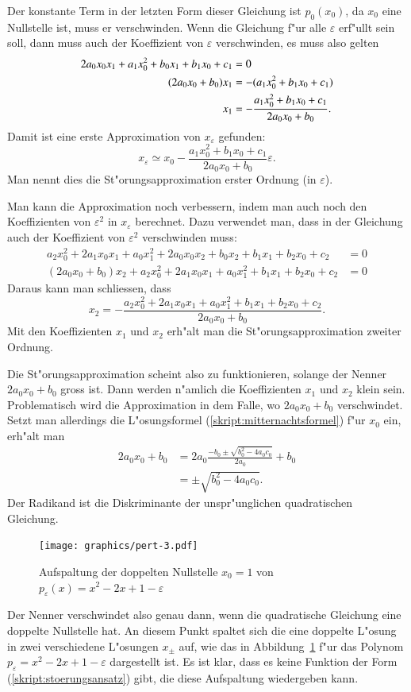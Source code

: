 Der konstante Term in der letzten Form dieser Gleichung ist $p_0(x_0)$, 
da $x_0$ eine Nullstelle ist, muss er verschwinden. Wenn die Gleichung
f"ur alle $\varepsilon$ erf"ullt sein soll, dann muss auch der
Koeffizient von $\varepsilon$ verschwinden, es muss also gelten
\begin{align}
2a_0x_0x_1+a_1x_0^2+b_0x_1+b_1x_0+c_1&= 0
\label{skript:stoerung-1ordnung}
\\
(2a_0x_0+b_0)x_1&=-(a_1x_0^2+b_1x_0+c_1)\\
x_1&=-
\frac{a_1x_0^2+b_1x_0+c_1}{2a_0x_0+b_0}.
\notag
\end{align}
Damit ist eine erste Approximation von $x_\varepsilon$ gefunden:
\[
x_\varepsilon\simeq x_0 -
\frac{a_1x_0^2+b_1x_0+c_1}{2a_0x_0+b_0}\varepsilon.
\]
Man nennt dies die St"orungsapproximation erster Ordnung (in $\varepsilon$).

Man kann die Approximation noch verbessern, indem man auch noch den
Koeffizienten von $\varepsilon^2$ in $x_\varepsilon$ berechnet.
Dazu verwendet man, dass in der Gleichung auch der Koeffizient von
$\varepsilon^2$ verschwinden muss:
\begin{align*}
a_2x_0^2 + 2a_1x_0x_1 + a_0x_1^2 +2a_0x_0x_2
+b_0x_2+b_1x_1+b_2x_0
+c_2
&=0
\\
(2a_0x_0+b_0)x_2
+a_2x_0^2 + 2a_1x_0x_1 + a_0x_1^2
+b_1x_1+b_2x_0
+c_2&=0
\end{align*}
Daraus kann man schliessen, dass
\[
x_2=-\frac{
a_2x_0^2 + 2a_1x_0x_1 + a_0x_1^2
+b_1x_1+b_2x_0
+c_2
}{2a_0x_0+b_0}.
\]
Mit den Koeffizienten $x_1$ und $x_2$ erh"alt man die St"orungsapproximation
zweiter Ordnung.

Die St"orungsapproximation scheint also zu funktionieren, solange
der Nenner $2a_0x_0+b_0$ gross ist. Dann werden n"amlich die 
Koeffizienten $x_1$ und $x_2$ klein sein. Problematisch wird
die Approximation in dem Falle, wo $2a_0x_0+b_0$ verschwindet.
Setzt man allerdings die L"osungsformel (\ref{skript:mitternachtsformel}) f"ur
$x_0$ ein, erh"alt man
\begin{align*}
2a_0x_0+b_0&=2a_0\frac{-b_0\pm\sqrt{b_0^2-4a_0c_0}}{2a_0}+b_0      \\
           &=\pm\sqrt{b_0^2-4a_0c_0}.
\end{align*}
Der Radikand ist die Diskriminante der unspr"unglichen quadratischen
Gleichung.
\begin{figure}
\centering
\texttt{[image: graphics/pert-3.pdf]}
\caption{Aufspaltung der doppelten Nullstelle $x_0=1$ von
$p_\varepsilon(x)=x^2-2x+1-\varepsilon$
\label{skript:entartetenullstellen}}
\end{figure}
Der Nenner verschwindet also genau dann, wenn die quadratische
Gleichung eine doppelte Nullstelle hat. An diesem Punkt spaltet sich
die eine doppelte L"osung in zwei verschiedene L"osungen $x_{\pm}$ auf,
wie das in Abbildung~\ref{skript:entartetenullstellen} f"ur
das Polynom $p_{\varepsilon}=x^2-2x+1-\varepsilon$ dargestellt ist.
Es ist klar, dass es keine Funktion der Form
(\ref{skript:stoerungsansatz}) 
gibt, die diese Aufspaltung wiedergeben kann.



